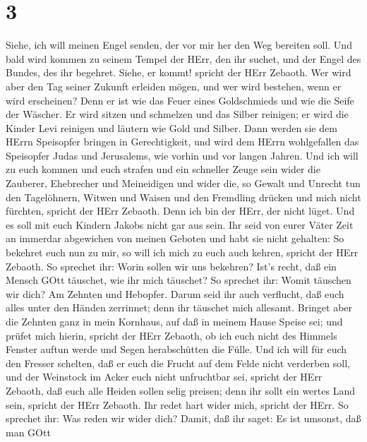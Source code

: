 \hypertarget{section-2}{%
\section{3}\label{section-2}}

 Siehe, ich will meinen Engel senden, der vor mir her den
Weg bereiten soll. Und bald wird kommen zu seinem Tempel der HErr, den
ihr suchet, und der Engel des Bundes, des ihr begehret. Siehe, er kommt!
spricht der HErr Zebaoth.  Wer wird aber den Tag seiner
Zukunft erleiden mögen, und wer wird bestehen, wenn er wird erscheinen?
Denn er ist wie das Feuer eines Goldschmieds und wie die Seife der
Wäscher.  Er wird sitzen und schmelzen und das Silber
reinigen; er wird die Kinder Levi reinigen und läutern wie Gold und
Silber. Dann werden sie dem HErrn Speisopfer bringen in Gerechtigkeit,
 und wird dem HErrn wohlgefallen das Speisopfer Judas und
Jerusalems, wie vorhin und vor langen Jahren.  Und ich will
zu euch kommen und euch strafen und ein schneller Zeuge sein wider die
Zauberer, Ehebrecher und Meineidigen und wider die, so Gewalt und
Unrecht tun den Tagelöhnern, Witwen und Waisen und den Fremdling drücken
und mich nicht fürchten, spricht der HErr Zebaoth.  Denn ich
bin der HErr, der nicht lüget. Und es soll mit euch Kindern Jakobs nicht
gar aus sein.  Ihr seid von eurer Väter Zeit an immerdar
abgewichen von meinen Geboten und habt sie nicht gehalten: So bekehret
euch nun zu mir, so will ich mich zu euch auch kehren, spricht der HErr
Zebaoth. So sprechet ihr: Worin sollen wir uns bekehren? 
Ist's recht, daß ein Mensch GOtt täuschet, wie ihr mich täuschet? So
sprechet ihr: Womit täuschen wir dich? Am Zehnten und Hebopfer.
 Darum seid ihr auch verflucht, daß euch alles unter den
Händen zerrinnet; denn ihr täuschet mich allesamt.  Bringet
aber die Zehnten ganz in mein Kornhaus, auf daß in meinem Hause Speise
sei; und prüfet mich hierin, spricht der HErr Zebaoth, ob ich euch nicht
des Himmels Fenster auftun werde und Segen herabschütten die Fülle.
 Und ich will für euch den Fresser schelten, daß er euch
die Frucht auf dem Felde nicht verderben soll, und der Weinstock im
Acker euch nicht unfruchtbar sei, spricht der HErr Zebaoth,
 daß euch alle Heiden sollen selig preisen; denn ihr sollt
ein wertes Land sein, spricht der HErr Zebaoth.  Ihr redet
hart wider mich, spricht der HErr. So sprechet ihr: Was reden wir wider
dich?  Damit, daß ihr saget: Es ist umsonst, daß man GOtt
